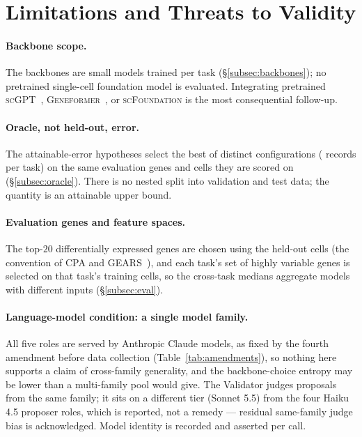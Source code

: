 \documentclass[10pt,a4paper]{article}
\begin{document}
\section{Limitations and Threats to Validity}\label{sec:limits}

\paragraph{Backbone scope.} \begin{sloppypar}The backbones are small models trained per task
(\S\ref{subsec:backbones}); no pretrained single-cell foundation model is
evaluated. Integrating pretrained \textsc{scGPT}~\citep{cui2024scgpt},
\textsc{Geneformer}~\citep{theodoris2023geneformer}, or
\textsc{scFoundation} is the most consequential follow-up.\end{sloppypar}

\paragraph{Oracle, not held-out, error.} The attainable-error hypotheses select the
best of \resNDistinctConfigs{} distinct configurations (\resNTrainerRecordsPerTask{}
records per task) on the same evaluation genes and cells they are scored on
(\S\ref{subsec:oracle}). There is no nested split into validation and test data; the
quantity is an attainable upper bound.

\paragraph{Evaluation genes and feature spaces.} The top-$20$ differentially
expressed genes are chosen using the held-out cells (the convention of CPA and
GEARS~\citep{lotfollahi2023cpa,roohani2024gears}), and
each task's set of highly variable genes is selected on that task's training cells, so the cross-task
medians aggregate models with different inputs (\S\ref{subsec:eval}).

\paragraph{Language-model condition: a single model family.} All five roles are served
by Anthropic Claude models, as fixed by the fourth amendment before data collection
(Table~\ref{tab:amendments}), so nothing here
supports a claim of cross-family generality, and the backbone-choice entropy may be
lower than a multi-family pool would give. The Validator judges proposals from the
same family; it sits on a different tier (Sonnet 5.5) from the four Haiku 4.5
proposer roles, which is reported, not a remedy --- residual same-family judge
bias is acknowledged. Model identity is recorded and asserted per call.
\end{document}
